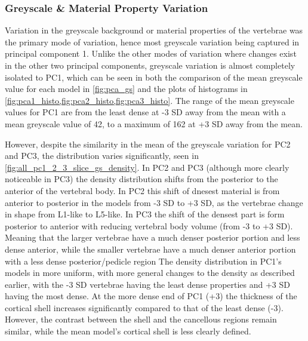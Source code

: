 \subsubsection{Greyscale \& Material Property Variation}

Variation in the greyscale background or material properties of the vertebrae was the primary mode of variation, hence most greyscale variation being captured in principal component 1.
Unlike the other modes of variation where changes exist in the other two principal components, greyscale variation is almost completely isolated to PC1, which can be seen in both the comparison of the mean greyscale value for each model in \cref{fig:pca_gs} and the plots of histograms in \cref{fig:pca1_histo,fig:pca2_histo,fig:pca3_histo}.
The range of the mean greyscale values for PC1 are from the least dense at -3 SD away from the mean with a mean greyscale value of 42, to a maximum of 162 at +3 SD away from the mean.

However, despite the similarity in the mean of the greyscale variation for PC2 and PC3, the distribution varies significantly, seen in \cref{fig:all_pc1_2_3_slice_gs_density}.
In PC2 and PC3 (although more clearly noticeable in PC3) the density distribution shifts from the posterior to the anterior of the vertebral body.
In PC2 this shift of dnesest material is from anterior to posterior in the models from -3 SD to +3 SD, as the vertebrae change in shape from L1-like to L5-like.
In PC3 the shift of the densest part is form posterior to anterior with reducing vertebral body volume (from -3 to +3 SD).
Meaning that the larger vertebrae have a much denser posterior portion and less dense anterior, while the smaller vertebrae have a much denser anterior portion with a less dense posterior/pedicle region
The density distribution in PC1's models in more uniform, with more general changes to the density as described earlier, with the -3 SD vertebrae having the least dense properties and +3 SD having the most dense. 
At the more dense end of PC1 (+3) the thickness of the cortical shell increases significantly compared to that of the least dense (-3).
However, the contrast between the shell and the cancellous regions remain similar, while the mean model's cortical shell is less clearly defined.

